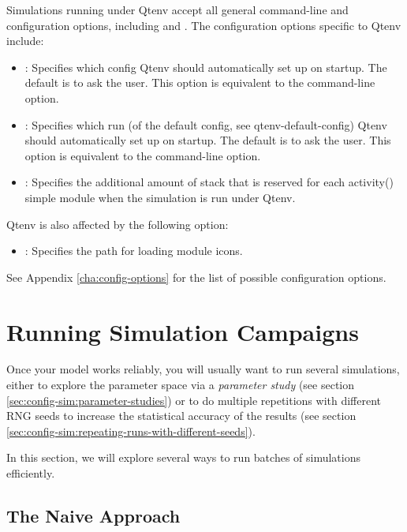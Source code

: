 Simulations running under Qtenv accept all general command-line and
configuration options, including  and . The configuration
options specific to Qtenv include:

\begin{itemize}
  \item {}: Specifies which config Qtenv should
    automatically set up on startup. The default is to ask the user. This option
    is equivalent to the  command-line option.

  \item {}: Specifies which run (of the default config,
    see qtenv-default-config) Qtenv should automatically set up on startup. The
    default is to ask the user. This option is equivalent to the 
    command-line option.

  \item {}: Specifies the additional amount of stack
    that is reserved for each activity() simple module when the simulation is run
    under Qtenv.
\end{itemize}

Qtenv is also affected by the following option:

\begin{itemize}
  \item {}: Specifies the path for loading module icons.
\end{itemize}

See Appendix \ref{cha:config-options} for the list of possible configuration options.


\section{Running Simulation Campaigns}
\label{sec:run-sim:simulation-campaigns}

Once your model works reliably, you will usually want to run several
simulations, either to explore the parameter space via a \textit{parameter
study} (see section \ref{sec:config-sim:parameter-studies}) or to do
multiple repetitions with different RNG seeds to increase the statistical
accuracy of the results (see section
\ref{sec:config-sim:repeating-runs-with-different-seeds}).

In this section, we will explore several ways to run batches of
simulations efficiently.

\subsection{The Naive Approach}
\label{sec:run-sim:campaigns-naive-approach}

